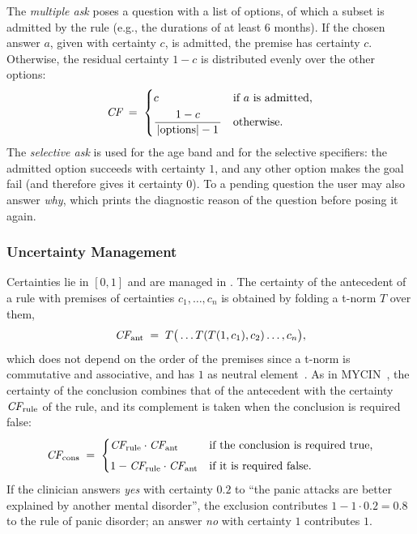 The \emph{multiple ask} poses a question with a list of options, of which a
subset is admitted by the rule (e.g., the durations of at least 6 months). If
the chosen answer $a$, given with certainty $c$, is admitted, the premise has
certainty $c$. Otherwise, the residual certainty $1-c$ is distributed evenly over
the other options:
\begin{equation}\label{eq:multiple}
\textit{CF} \;=\;
\begin{cases}
c & \text{if $a$ is admitted,}\\[4pt]
\dfrac{1-c}{\,|\text{options}|-1\,} & \text{otherwise.}
\end{cases}
\end{equation}
The \emph{selective ask} is used for the age band and for the selective
specifiers: the admitted option succeeds with certainty $1$, and any other
option makes the goal fail (and therefore gives it certainty $0$). To a pending
question the user may also answer \emph{why}, which prints the diagnostic reason
of the question before posing it again.

\subsubsection{Uncertainty Management}
\label{sec:uncertainty}

Certainties lie in $[0,1]$ and are managed in . The
certainty of the antecedent of a rule with premises of certainties
$c_1, \dots, c_n$ is obtained by folding a t-norm $T$ over them,
\begin{equation}\label{eq:antecedent}
\textit{CF}_{\text{ant}} \;=\; T\big( \dots T( T(1, c_1), c_2 ) \dots, c_n \big) ,
\end{equation}
which does not depend on the order of the premises since a t-norm is
commutative and associative, and has $1$ as neutral element~\cite{klement}. As in MYCIN~\cite{shortliffe-buchanan}, the certainty of the conclusion combines
that of the antecedent with the certainty $\textit{CF}_{\text{rule}}$ of the rule, and
its complement is taken when the conclusion is required false:
\begin{equation}\label{eq:consequent}
\textit{CF}_{\text{cons}} \;=\;
\begin{cases}
\textit{CF}_{\text{rule}} \cdot \textit{CF}_{\text{ant}} & \text{if the conclusion is required true,}\\[4pt]
1 - \textit{CF}_{\text{rule}} \cdot \textit{CF}_{\text{ant}} & \text{if it is required false.}
\end{cases}
\end{equation}
If the clinician answers \emph{yes} with certainty $0.2$ to ``the panic attacks
are better explained by another mental disorder'', the exclusion contributes
$1 - 1 \cdot 0.2 = 0.8$ to the rule of panic disorder; an answer \emph{no} with
certainty $1$ contributes $1$.


